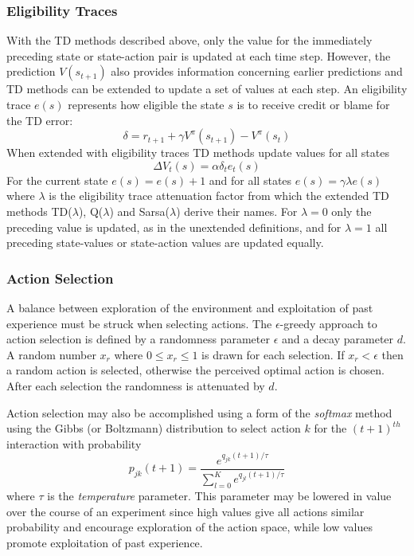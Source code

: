 \subsubsection{Eligibility Traces}
\label{sec:eligibility}
With the TD methods described above, only the value for the immediately
preceding state or state-action pair is updated at each time step.  However,
the prediction $V(s_{t+1})$ also provides information concerning earlier
predictions and TD methods can be extended to update a set of values at each step.  An eligibility trace $e(s)$ represents how eligible the state $s$ is to receive
credit or blame for the TD error:
\begin{equation}
\delta = r_{t+1} + \gamma V^\pi(s_{t+1}) - V^\pi(s_t)
\end{equation}
When extended with eligibility traces TD methods update values for all states
\begin{equation}
\Delta V_t(s) = \alpha \delta_t e_t(s)
\end{equation}
For the current state $e(s) = e(s) + 1$ and for all states
$e(s) = \gamma \lambda e(s)$ where $\lambda$ is the eligibility trace
attenuation factor from which the extended TD methods TD($\lambda$),
Q($\lambda$) and Sarsa($\lambda$) derive their names. For $\lambda = 0$ only
the preceding value is updated, as in the unextended definitions,
and for $\lambda = 1$ all preceding state-values or state-action values are
updated equally.

\subsubsection{Action Selection}
A balance between exploration of the environment and exploitation of past
experience must be struck when selecting actions.  The $\epsilon$-greedy
approach to action selection is defined by a randomness parameter $\epsilon$ and
a decay parameter $d$.  A random number $x_r$ where $0 \leq x_r \leq 1$ is drawn
for each selection.  If $x_r < \epsilon$ then a random action is selected,
otherwise the perceived optimal action is chosen. After each selection the
randomness is attenuated by $d$.

Action selection may also be accomplished using a form of the \textit{softmax}
method \cite[\S2]{suttonbarto:1998} using the Gibbs (or
Boltzmann) distribution to select action $k$ for the $(t+1)^{th}$ interaction with probability
\begin{equation}
p_{jk}(t+1) = \frac{e^{q_{jk}(t+1)/\tau}}{\sum_{l=0}^K e^{q_{jl}(t+1)/\tau}}
\end{equation}
where $\tau$ is the \textit{temperature} parameter.  This parameter may be
lowered in value over the course of an experiment since high values give all
actions similar probability and encourage exploration of the action space,
while low values promote exploitation of past experience.

